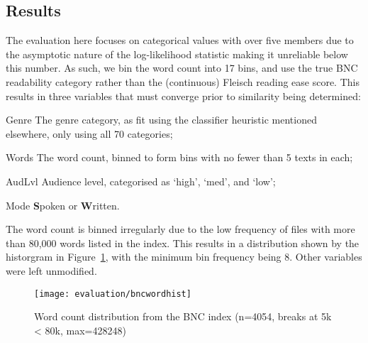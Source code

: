 

\subsection{Results}

The evaluation here focuses on categorical values with over five members due to the asymptotic nature of the log-likelihood statistic making it unreliable below this number.  As such, we bin the word count into 17 bins, and use the true BNC readability category rather than the (continuous) Fleisch reading ease score.  This results in three variables that must converge prior to similarity being determined:

\begin{itemizeTitle}
    \item[Genre]  The genre category, as fit using the classifier heuristic mentioned elsewhere, only using all 70 categories;
    \item[Words]  The word count, binned to form bins with no fewer than 5 texts in each;
    \item[AudLvl] Audience level, categorised as `high', `med', and `low';
    \item[Mode]   \textbf{S}poken or \textbf{W}ritten.
\end{itemizeTitle}

The word count is binned irregularly due to the low frequency of files with more than 80,000 words listed in the index.  This results in a distribution shown by the historgram in Figure~\ref{fig:evaluation:resampling:bncwordhist}, with the minimum bin frequency being 8.  Other variables were left unmodified.


\begin{figure}[Ht]

    \centering
    \texttt{[image: evaluation/bncwordhist]}
    \caption{Word count distribution from the BNC index (n=4054, breaks at 5k < 80k, max=428248)}
    \label{fig:evaluation:resampling:bncwordhist}
\end{figure}


